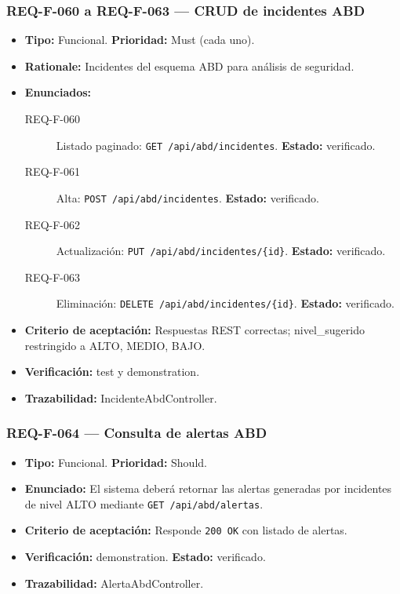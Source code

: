 \documentclass[12pt,a4paper]{article}
\begin{document}
\subsubsection{REQ-F-060 a REQ-F-063 --- CRUD de incidentes ABD}
\begin{itemize}
  \item \textbf{Tipo:} Funcional. \textbf{Prioridad:} Must (cada uno).
  \item \textbf{Rationale:} Incidentes del esquema ABD para análisis de seguridad.
  \item \textbf{Enunciados:}
    \begin{description}
      \item[REQ-F-060] Listado paginado: \texttt{GET /api/abd/incidentes}. \textbf{Estado:} verificado.
      \item[REQ-F-061] Alta: \texttt{POST /api/abd/incidentes}. \textbf{Estado:} verificado.
      \item[REQ-F-062] Actualización: \texttt{PUT /api/abd/incidentes/\{id\}}. \textbf{Estado:} verificado.
      \item[REQ-F-063] Eliminación: \texttt{DELETE /api/abd/incidentes/\{id\}}. \textbf{Estado:} verificado.
    \end{description}
  \item \textbf{Criterio de aceptación:} Respuestas REST correctas; nivel_sugerido restringido a ALTO, MEDIO, BAJO.
  \item \textbf{Verificación:} test y demonstration.
  \item \textbf{Trazabilidad:} IncidenteAbdController.
\end{itemize}

\subsubsection{REQ-F-064 --- Consulta de alertas ABD}
\begin{itemize}
  \item \textbf{Tipo:} Funcional. \textbf{Prioridad:} Should.
  \item \textbf{Enunciado:} El sistema deberá retornar las alertas generadas por incidentes de nivel ALTO mediante \texttt{GET /api/abd/alertas}.
  \item \textbf{Criterio de aceptación:} Responde \texttt{200 OK} con listado de alertas.
  \item \textbf{Verificación:} demonstration. \textbf{Estado:} verificado.
  \item \textbf{Trazabilidad:} AlertaAbdController.
\end{itemize}
\end{document}
